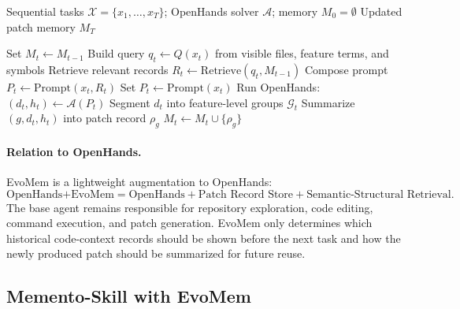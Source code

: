 \documentclass{llmxive}
\begin{document}
\begin{algorithm}[H]
\caption{EvoMem: Patch Memory for OpenHands}
\label{alg:evomem_openhands}
\begin{algorithmic}[1]
\Require Sequential tasks $\mathcal{X}=\{x_1,\ldots,x_T\}$; OpenHands solver $\mathcal{A}$; memory $M_0=\emptyset$
\Ensure Updated patch memory $M_T$

    \State Set $M_t\leftarrow M_{t-1}$
    \State Build query $q_t\leftarrow Q(x_t)$ from visible files, feature terms, and symbols
    \State Retrieve relevant records $R_t\leftarrow \mathrm{Retrieve}(q_t,M_{t-1})$
        \State Compose prompt $P_t\leftarrow \mathrm{Prompt}(x_t,R_t)$
    \Else
        \State Set $P_t\leftarrow \mathrm{Prompt}(x_t)$
    \EndIf
    \State Run OpenHands: $(d_t,h_t)\leftarrow \mathcal{A}(P_t)$
    \State Segment $d_t$ into feature-level groups $\mathcal{G}_t$
        \State Summarize $(g,d_t,h_t)$ into patch record $\rho_g$
        \State $M_t\leftarrow M_t\cup\{\rho_g\}$
    \EndFor
\EndFor
\end{algorithmic}
\end{algorithm}

\paragraph{Relation to OpenHands.}
EvoMem is a lightweight augmentation to OpenHands:
\[
\text{OpenHands+EvoMem}
=
\text{OpenHands}
+
\text{Patch Record Store}
+
\text{Semantic-Structural Retrieval}.
\]
The base agent remains responsible for repository exploration, code editing, command execution, and patch generation. EvoMem only determines which historical code-context records should be shown before the next task and how the newly produced patch should be summarized for future reuse.











\subsection{Memento-Skill with EvoMem}
\label{sec:evomem_memento}



\end{document}
